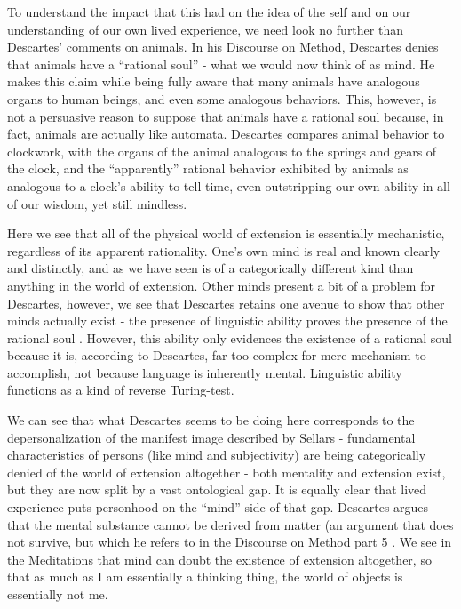 \documentclass[phd,12pt,oneside,paper=letterpaper]{ubcthesis}
\begin{document}
To understand the impact that this had on the idea of the self and on our understanding of our own lived experience, we need look no further than Descartes' comments on animals. In his Discourse on Method, Descartes denies that animals have a ``rational soul'' - what we would now think of as mind. He makes this claim while being fully aware that many animals have analogous organs to human beings, and even some analogous behaviors. This, however, is not a persuasive reason to suppose that animals have a rational soul because, in fact, animals are actually like automata. Descartes compares animal behavior to clockwork, with the organs of the animal analogous to the springs and gears of the clock, and the ``apparently'' rational behavior exhibited by animals as analogous to a clock's ability to tell time, even outstripping our own ability in all of our wisdom, yet still mindless. \citep[p.141]{descartes1984a}

Here we see that all of the physical world of extension is essentially mechanistic, regardless of its apparent rationality. One's own mind is real and known clearly and distinctly, and as we have seen is of a categorically different kind than anything in the world of extension. Other minds present a bit of a problem for Descartes, however, we see that Descartes retains one avenue to show that other minds actually exist - the presence of linguistic ability proves the presence of the rational soul \citep[p.140]{descartes1984a}. However, this ability only evidences the existence of a rational soul because it is, according to Descartes, far too complex for mere mechanism to accomplish, not because language is inherently mental. Linguistic ability functions as a kind of reverse Turing-test.

We can see that what Descartes seems to be doing here corresponds to the depersonalization of the manifest image described by Sellars - fundamental characteristics of persons (like mind and subjectivity) are being categorically denied of the world of extension altogether - both mentality and extension exist, but they are now split by a vast ontological gap. It is equally clear that lived experience puts personhood on the ``mind'' side of that gap.  Descartes argues that the mental substance cannot be derived from matter (an argument that does not survive, but which he refers to in the Discourse on Method part 5 \citep[p.141]{descartes1984a}. We see in the Meditations that mind can doubt the existence of extension altogether, so that as much as I am essentially a thinking thing, the world of objects is essentially not me. 
\end{document}
